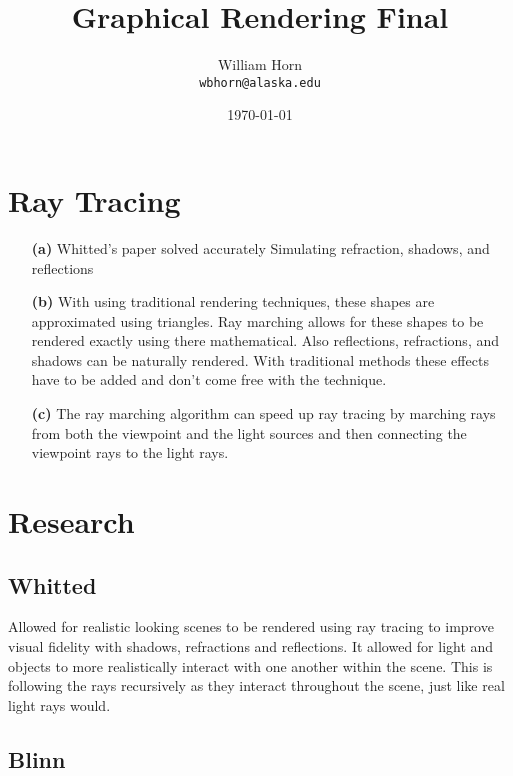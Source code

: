 \documentclass{article}
\begin{document}
\newcommand{\vect}[1]{\mathbf{#1}}

\title{\textbf{Graphical Rendering Final}}

\author{
  William Horn\\
  \texttt{wbhorn@alaska.edu}
}
\date{\today}
\maketitle

\section{Ray Tracing}

\begin{itemize}
    \item[\textbf{(a)}] Whitted's paper solved accurately Simulating refraction, shadows, and reflections
    \item[\textbf{(b)}] With using traditional rendering techniques, these shapes are approximated using
        triangles. Ray marching allows for these shapes to be rendered exactly using there mathematical.
        Also reflections, refractions, and shadows can be naturally rendered. With traditional methods
        these effects have to be added and don't come free with the technique.
    \item[\textbf{(c)}] The ray marching algorithm can speed up ray tracing by marching rays from both
        the viewpoint and the light sources and then connecting the viewpoint rays to the light rays.
\end{itemize}

\section{Research}

\subsection{Whitted}

Allowed for realistic looking scenes to be rendered using ray tracing to improve visual fidelity with
shadows, refractions and reflections. It allowed for light and objects to more realistically interact with
one another within the scene. This is following the rays recursively as they interact throughout the scene,
just like real light rays would.

\subsection{Blinn}
\end{document}
